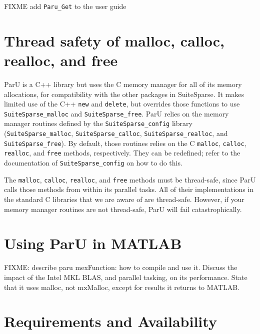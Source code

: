 \documentclass[12pt]{article}
\begin{document}
FIXME add \verb'Paru_Get' to the user guide

\section{Thread safety of {\sf malloc}, {\sf calloc}, {\sf realloc}, and
{\sf free}}

ParU is a C++ library but uses the C memory manager for all of its memory
allocations, for compatibility with the other packages in SuiteSparse.  It
makes limited use of the C++ \verb'new' and \verb'delete', but overrides those
functions to use \verb'SuiteSparse_malloc' and \verb'SuiteSparse_free'.  ParU
relies on the memory manager routines defined by the \verb'SuiteSparse_config'
library (\verb'SuiteSparse_malloc', \verb'SuiteSparse_calloc',
\verb'SuiteSparse_realloc', and \verb'SuiteSparse_free').  By default, those
routines relies on the C \verb'malloc', \verb'calloc', \verb'realloc', and
\verb'free' methods, respectively.  They can be redefined; refer to the
documentation of \verb'SuiteSparse_config' on how to do this.

The \verb'malloc', \verb'calloc', \verb'realloc', and \verb'free' methods must
be thread-safe, since ParU calls those methods from within its parallel tasks.
All of their implementations in the standard C libraries that we are aware of
are thread-safe.  However, if your memory manager routines are not thread-safe,
ParU will fail catastrophically.

\section{Using ParU in MATLAB}

FIXME: describe paru mexFunction: how to compile and use it.  Discuss
the impact of the Intel MKL BLAS, and parallel tasking, on its performance.
State that it uses malloc, not mxMalloc, except for results it returns to
MATLAB.

\section{Requirements and Availability}
\label{summary}
\end{document}
